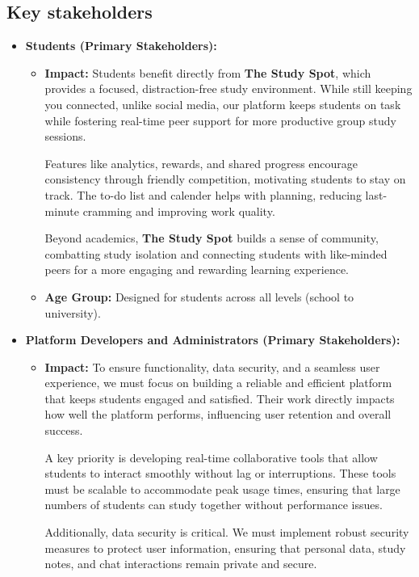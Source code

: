 \subsection{Key stakeholders}
\begin{itemize}
    \item \textbf{Students (Primary Stakeholders):}
    \begin{itemize}
        \item \textbf{Impact:} Students benefit directly from \textbf{The Study Spot}, which provides a focused, distraction-free study environment. While still keeping you connected, unlike social media, our platform keeps students on task while fostering real-time peer support for more productive group study sessions.

        Features like analytics, rewards, and shared progress encourage consistency through friendly competition, motivating students to stay on track. The to-do list and calender helps with planning, reducing last-minute cramming and improving work quality.

        Beyond academics, \textbf{The Study Spot} builds a sense of community, combatting study isolation and connecting students with like-minded peers for a more engaging and rewarding learning experience.
        \item \textbf{Age Group:} Designed for students across all levels (school to university).
    \end{itemize}

    \item \textbf{Platform Developers and Administrators (Primary Stakeholders):}
    \begin{itemize}
        \item \textbf{Impact:} To ensure functionality, data security, and a seamless user experience, we must focus on building a reliable and efficient platform that keeps students engaged and satisfied. Their work directly impacts how well the platform performs, influencing user retention and overall success.

        A key priority is developing real-time collaborative tools that allow students to interact smoothly without lag or interruptions. These tools must be scalable to accommodate peak usage times, ensuring that large numbers of students can study together without performance issues.

        Additionally, data security is critical. We must implement robust security measures to protect user information, ensuring that personal data, study notes, and chat interactions remain private and secure.


\end{itemize}
\end{itemize}

